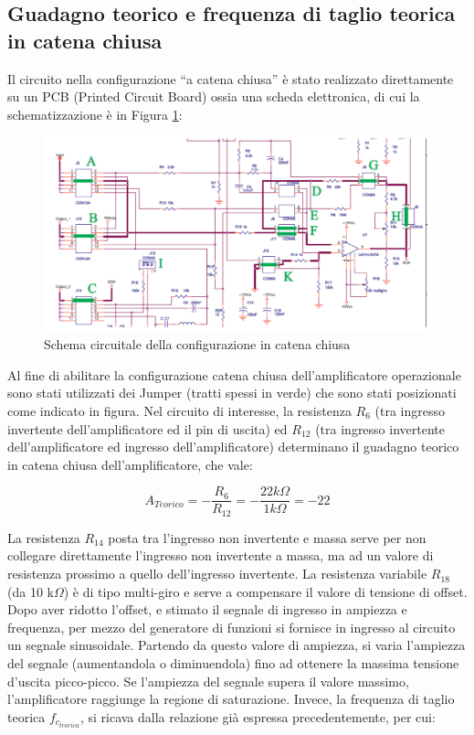 \subsection{Guadagno teorico e frequenza di taglio teorica in catena chiusa}

Il circuito nella configurazione “a catena chiusa” è stato realizzato direttamente su un PCB (Printed Circuit Board) ossia una scheda elettronica, di cui la schematizzazione è in Figura \ref{fig:schemaCatenaChiusa}:
\begin{figure}[h]
    \centering
    \includegraphics[width=1\linewidth]{media/schemaCircuitaleuA741.png}
    \caption{Schema circuitale della configurazione in catena chiusa}
    \label{fig:schemaCatenaChiusa}
\end{figure}
\FloatBarrier

Al fine di abilitare la configurazione catena chiusa dell'amplificatore operazionale sono stati utilizzati dei Jumper (tratti spessi in verde) che sono stati posizionati come indicato in figura.
\FloatBarrier
Nel circuito di interesse, la resistenza \(R_6\) (tra ingresso invertente dell’amplificatore ed il pin di uscita) ed \(R_{12}\) (tra ingresso invertente dell’amplificatore ed ingresso dell’amplificatore) determinano il guadagno teorico in catena chiusa dell’amplificatore, che vale:

\[A_{Teorico}=-\frac{R_6}{R_{12}}=-\frac{22 k\Omega}{1 k\Omega}=-22\]

La resistenza \(R_{14}\) posta tra l’ingresso non invertente e massa serve per non collegare direttamente l’ingresso non invertente a massa, ma ad un valore di resistenza prossimo a quello dell’ingresso invertente. La resistenza variabile \(R_{18}\) (da 10 k\(\Omega\)) è di tipo multi-giro e serve a compensare il valore di tensione di offset. Dopo aver ridotto l’offset, e stimato il segnale di ingresso in ampiezza e frequenza, per mezzo del generatore di funzioni si fornisce in ingresso al circuito un segnale sinusoidale. Partendo da questo valore di ampiezza, si varia l’ampiezza del segnale (aumentandola o diminuendola) fino ad ottenere la massima tensione d’uscita picco-picco. Se l’ampiezza del segnale supera il valore massimo, l’amplificatore raggiunge la regione di saturazione.
Invece, la frequenza di taglio teorica \(f_{c_{teorica}}\), si ricava dalla relazione già espressa precedentemente, per cui:

